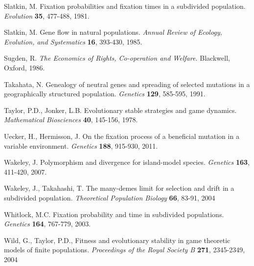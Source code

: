 \documentclass[11pt]{article}
\begin{document}
\begin{thebibliography}{99}
Slatkin, M. Fixation probabilities and fixation times in a subdivided population. {\it Evolution }  {\bf 35}, 477-488, 1981.

Slatkin, M.  Gene flow in natural populations. {\it Annual Review of Ecology, Evolution, and Systematics}  {\bf 16}, 393-430, 1985.




%


Sugden, R. {\it The Economics of Rights, Co-operation and Welfare.} Blackwell, Oxford, 1986.


Takahata, N. Genealogy of neutral genes and spreading of selected mutations in a geographically structured population. {\it  Genetics } {\bf 129}, 585-595, 1991.

Taylor, P.D., Jonker, L.B.  Evolutionary stable strategies and game dynamics. {\it Mathematical Biosciences} {\bf 40}, 145-156, 1978.

Uecker, H., Hermisson, J. On the fixation process of a beneficial mutation in a variable environment. {\it  Genetics } {\bf 188}, 915-930, 2011.

Wakeley, J. Polymorphism and divergence for island-model species. {\it Genetics} {\bf 163}, 411-420, 2007.

Wakeley, J., Takahashi, T. The many-demes limit for selection and drift in a subdivided population. {\it Theoretical Population Biology} {\bf  66}, 83-91, 2004


Whitlock, M.C. Fixation probability and time in subdivided populations.  {\it Genetics} {\bf 164}, 767-779, 2003.


Wild, G., Taylor, P.D.,  Fitness and evolutionary stability in game theoretic models of finite populations. {\it  Proceedings of the Royal Society B} {\bf 271},
2345-2349, 2004


\end{thebibliography}
\end{document}
